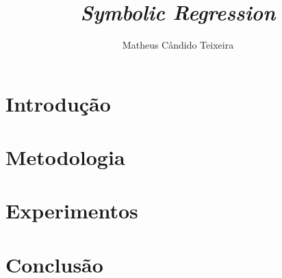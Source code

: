 \documentclass[a4paper]{paper}
\begin{document}
\title{{\itshape Symbolic Regression}}
\author{Matheus Cândido Teixeira}
\maketitle

\section{Introdução}
\section{Metodologia}
\section{Experimentos}
\section{Conclusão}
\end{document}
